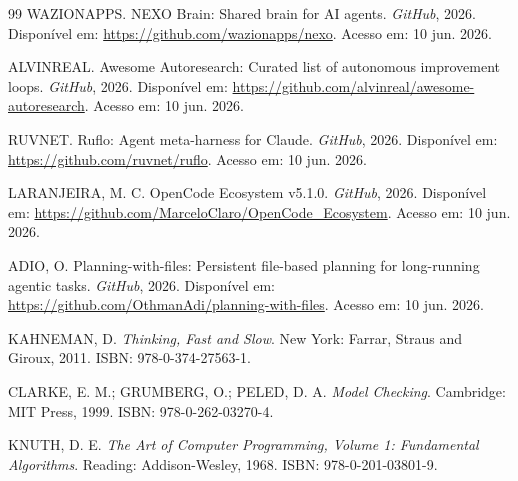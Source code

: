 \documentclass[12pt,a4paper,oneside]{abntex2}
\begin{document}
\begin{thebibliography}{99}
WAZIONAPPS. NEXO Brain: Shared brain for AI agents. \textit{GitHub}, 2026. Disponível em: \url{https://github.com/wazionapps/nexo}. Acesso em: 10 jun. 2026.

ALVINREAL. Awesome Autoresearch: Curated list of autonomous improvement loops. \textit{GitHub}, 2026. Disponível em: \url{https://github.com/alvinreal/awesome-autoresearch}. Acesso em: 10 jun. 2026.

RUVNET. Ruflo: Agent meta-harness for Claude. \textit{GitHub}, 2026. Disponível em: \url{https://github.com/ruvnet/ruflo}. Acesso em: 10 jun. 2026.

LARANJEIRA, M. C. OpenCode Ecosystem v5.1.0. \textit{GitHub}, 2026. Disponível em: \url{https://github.com/MarceloClaro/OpenCode_Ecosystem}. Acesso em: 10 jun. 2026.

ADIO, O. Planning-with-files: Persistent file-based planning for long-running agentic tasks. \textit{GitHub}, 2026. Disponível em: \url{https://github.com/OthmanAdi/planning-with-files}. Acesso em: 10 jun. 2026.

KAHNEMAN, D. \textit{Thinking, Fast and Slow}. New York: Farrar, Straus and Giroux, 2011. ISBN: 978-0-374-27563-1.

CLARKE, E. M.; GRUMBERG, O.; PELED, D. A. \textit{Model Checking}. Cambridge: MIT Press, 1999. ISBN: 978-0-262-03270-4.

KNUTH, D. E. \textit{The Art of Computer Programming, Volume 1: Fundamental Algorithms}. Reading: Addison-Wesley, 1968. ISBN: 978-0-201-03801-9.

\end{thebibliography}
\end{document}
